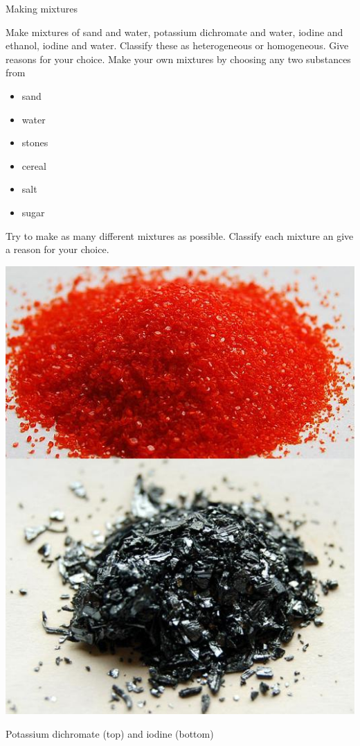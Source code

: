 
\begin{activity}{Making mixtures}
{
\begin{minipage}{0.6\textwidth}
Make mixtures of sand and water, potassium dichromate and water, iodine and ethanol, iodine and water. Classify these as heterogeneous or homogeneous. Give reasons for your choice. Make your own mixtures by choosing any two substances from \begin{itemize}[noitemsep] \item sand \item water \item stones \item cereal \item salt \item sugar \end{itemize} Try to make as many different mixtures as possible. Classify each mixture an give a reason for your choice.
                                                                                                                                                                                                                                                                                                                                                                                                                      
\end{minipage}
\begin{minipage}{.4\textwidth}
{
\begin{center}
 \includegraphics[width=.7\textwidth]{photos/iodine-KCr2O7-wikipedia.jpg}\par
\begin{caption}Potassium dichromate (top) and iodine (bottom)\end{caption}
\end{center}
}

\end{minipage}
}
\end{activity}
